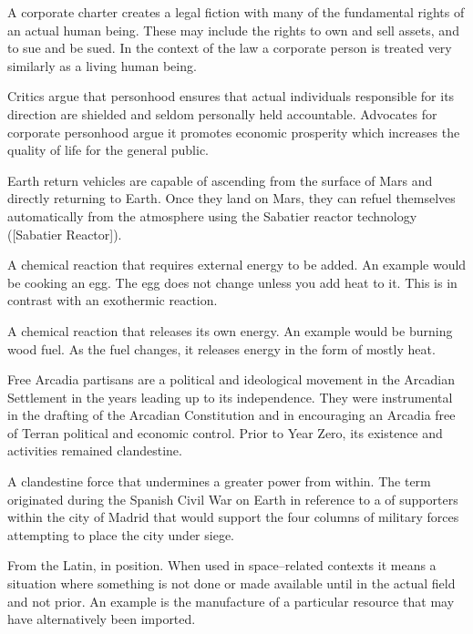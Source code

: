 A corporate charter creates a legal fiction with many of the fundamental rights of an actual human being. These may include the rights to own and sell assets, and to sue and be sued. In the context of the law a corporate person is treated very similarly as a living human being.

Critics argue that personhood ensures that actual individuals responsible for its direction are shielded and seldom personally held accountable. Advocates for corporate personhood argue it promotes economic prosperity which increases the quality of life for the general public.

Earth return vehicles are capable of ascending from the surface of Mars and directly returning to Earth. Once they land on Mars, they can refuel themselves automatically from the atmosphere using the Sabatier reactor technology ([Sabatier Reactor]).

A chemical reaction that requires external energy to be added. An example would be cooking an egg. The egg does not change unless you add heat to it. This is in contrast with an exothermic reaction.

A chemical reaction that releases its own energy. An example would be burning wood fuel. As the fuel changes, it releases energy in the form of mostly heat.

Free Arcadia partisans are a political and ideological movement in the Arcadian Settlement in the years leading up to its independence. They were instrumental in the drafting of the Arcadian Constitution and in encouraging an Arcadia free of Terran political and economic control. Prior to Year Zero, its existence and activities remained clandestine.

A clandestine force that undermines a greater power from within. The term originated during the Spanish Civil War on Earth in reference to a  of supporters within the city of Madrid that would support the four columns of military forces attempting to place the city under siege.

From the Latin, in position. When used in space--related contexts it means a situation where something is not done or made available until in the actual field and not prior. An example is the manufacture of a particular resource that may have alternatively been imported.


